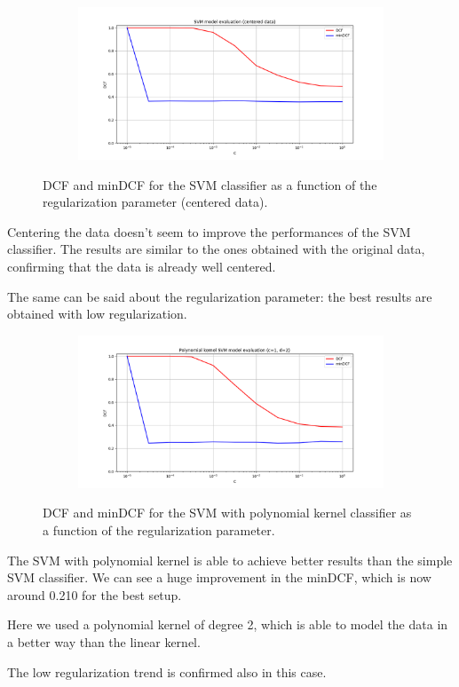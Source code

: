 \documentclass[12pt]{report}
\newcommand{\nl}{%
    \newline
    \noindent
}
\begin{document}
\begin{figure}[H]
    \centering
    \begin{subfigure}[t]{0.6\textwidth}
        \includegraphics[width=\textwidth]{./plot/SVM/svm_centered.png}
    \end{subfigure}
    \caption{DCF and minDCF for the SVM classifier as a function of the regularization parameter (centered data).}
    \label{fig:svm_centered}
\end{figure}
\noindent
Centering the data doesn't seem to improve the performances of the SVM classifier. The results are similar to the ones obtained with the original data, confirming that the data is already well centered.
\nl
The same can be said about the regularization parameter: the best results are obtained with low regularization.

\begin{figure}[H]
    \centering
    \begin{subfigure}[t]{0.6\textwidth}
        \includegraphics[width=\textwidth]{./plot/SVM/svm_poly.png}
    \end{subfigure}
    \caption{DCF and minDCF for the SVM with polynomial kernel classifier as a function of the regularization parameter.}
    \label{fig:svm_poly}
\end{figure}
\noindent
The SVM with polynomial kernel is able to achieve better results than the simple SVM classifier. We can see a huge improvement in the minDCF, which is now around 0.210 for the best setup.
\nl
Here we used a polynomial kernel of degree 2, which is able to model the data in a better way than the linear kernel.
\nl
The low regularization trend is confirmed also in this case.
\end{document}
